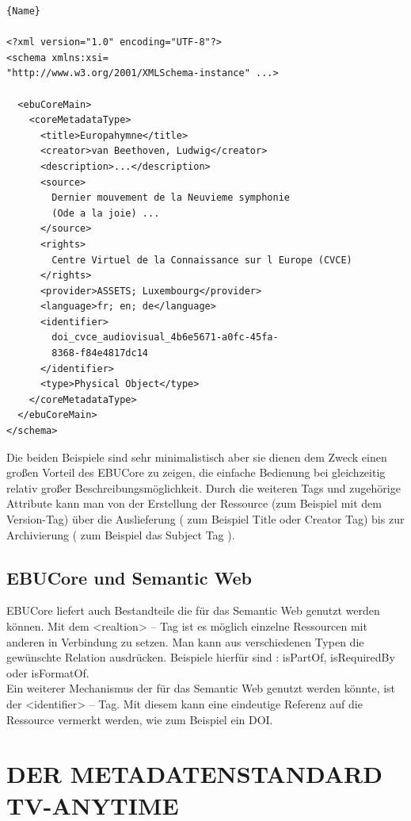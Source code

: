 \begin{lstlisting}[caption=Beispiel-XML EBUCore für die Europahymne]{Name}

<?xml version="1.0" encoding="UTF-8"?>
<schema xmlns:xsi=
"http://www.w3.org/2001/XMLSchema-instance" ...>

  <ebuCoreMain>
    <coreMetadataType>
      <title>Europahymne</title>
      <creator>van Beethoven, Ludwig</creator>
      <description>...</description>
      <source>
      	Dernier mouvement de la Neuvieme symphonie 
      	(Ode a la joie) ...
      </source>  
      <rights>
      	Centre Virtuel de la Connaissance sur l Europe (CVCE)
      </rights>
      <provider>ASSETS; Luxembourg</provider>
      <language>fr; en; de</language>
      <identifier>
      	doi_cvce_audiovisual_4b6e5671-a0fc-45fa-
      	8368-f84e4817dc14
      </identifier>
      <type>Physical Object</type>
    </coreMetadataType>
  </ebuCoreMain>
</schema>
\end{lstlisting}

Die beiden Beispiele sind sehr minimalistisch aber sie dienen dem Zweck einen großen Vorteil des EBUCore zu zeigen, die einfache Bedienung bei gleichzeitig relativ großer Beschreibungsmöglichkeit. Durch die weiteren Tags und zugehörige Attribute kann man von der Erstellung der Ressource (zum Beispiel mit dem Version-Tag) über die Auslieferung ( zum Beispiel Title oder Creator Tag)  bis zur Archivierung ( zum Beispiel das Subject Tag ).
\subsection{EBUCore und Semantic Web}

EBUCore liefert auch Bestandteile die für das Semantic Web genutzt werden können. Mit dem <realtion> -- Tag ist es möglich einzelne Ressourcen mit anderen in Verbindung zu setzen. Man kann aus verschiedenen Typen die gewünschte Relation ausdrücken. Beispiele hierfür sind : isPartOf, isRequiredBy oder isFormatOf.\\
Ein weiterer Mechanismus der für das Semantic Web genutzt werden könnte, ist der <identifier> -- Tag. Mit diesem kann eine eindeutige Referenz auf die Ressource vermerkt werden, wie zum Beispiel ein DOI.
	\newpage
	\section{DER METADATENSTANDARD TV-ANYTIME}
